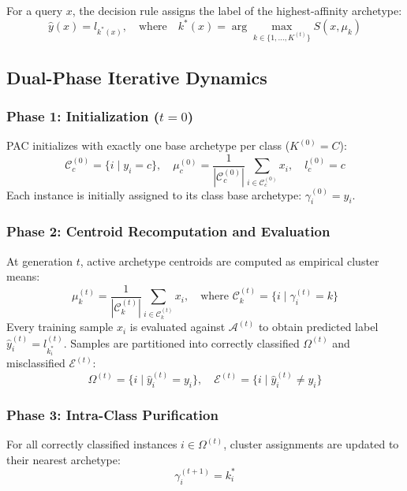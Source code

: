 \documentclass[11pt,a4paper]{article}
\begin{document}
For a query $x$, the decision rule assigns the label of the highest-affinity archetype:
\begin{equation}
    \hat{y}(x) = l_{k^*(x)}, \quad \text{where} \quad k^*(x) = \arg\max_{k \in \{1, \dots, K^{(t)}\}} S(x, \mu_k)
\end{equation}

\subsection{Dual-Phase Iterative Dynamics}

\subsubsection{Phase 1: Initialization (\texorpdfstring{$t = 0$}{t=0})}
PAC initializes with exactly one base archetype per class ($K^{(0)} = C$):
\begin{equation}
    \mathcal{C}_c^{(0)} = \{i \mid y_i = c\}, \quad \mu_c^{(0)} = \frac{1}{|\mathcal{C}_c^{(0)}|} \sum_{i \in \mathcal{C}_c^{(0)}} x_i, \quad l_c^{(0)} = c
\end{equation}
Each instance is initially assigned to its class base archetype: $\gamma_i^{(0)} = y_i$.

\subsubsection{Phase 2: Centroid Recomputation and Evaluation}
At generation $t$, active archetype centroids are computed as empirical cluster means:
\begin{equation}
    \mu_k^{(t)} = \frac{1}{|\mathcal{C}_k^{(t)}|} \sum_{i \in \mathcal{C}_k^{(t)}} x_i, \quad \text{where } \mathcal{C}_k^{(t)} = \{i \mid \gamma_i^{(t)} = k\}
\end{equation}
Every training sample $x_i$ is evaluated against $\mathcal{A}^{(t)}$ to obtain predicted label $\hat{y}_i^{(t)} = l_{k_i^*}^{(t)}$. Samples are partitioned into correctly classified $\Omega^{(t)}$ and misclassified $\mathcal{E}^{(t)}$:
\begin{equation}
    \Omega^{(t)} = \{i \mid \hat{y}_i^{(t)} = y_i\}, \quad \mathcal{E}^{(t)} = \{i \mid \hat{y}_i^{(t)} \neq y_i\}
\end{equation}

\subsubsection{Phase 3: Intra-Class Purification}
For all correctly classified instances $i \in \Omega^{(t)}$, cluster assignments are updated to their nearest archetype:
\begin{equation}
    \gamma_i^{(t+1)} = k_i^*
\end{equation}
\end{document}

